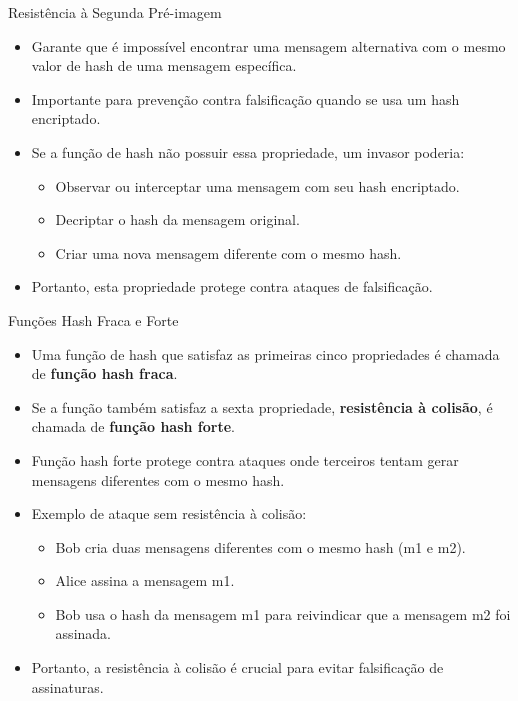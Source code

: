 \begin{frame}{Resistência à Segunda Pré-imagem}
    \begin{itemize}
        \item Garante que é impossível encontrar uma mensagem alternativa com o mesmo valor de hash de uma mensagem específica.
        \item Importante para prevenção contra falsificação quando se usa um hash encriptado.
        \item Se a função de hash não possuir essa propriedade, um invasor poderia:
        \begin{itemize}
            \item Observar ou interceptar uma mensagem com seu hash encriptado.
            \item Decriptar o hash da mensagem original.
            \item Criar uma nova mensagem diferente com o mesmo hash.
        \end{itemize}
        \item Portanto, esta propriedade protege contra ataques de falsificação.
    \end{itemize}
\end{frame}

\begin{frame}{Funções Hash Fraca e Forte}
    \begin{itemize}
        \item Uma função de hash que satisfaz as primeiras cinco propriedades é chamada de \textbf{função hash fraca}.
        \item Se a função também satisfaz a sexta propriedade, \textbf{resistência à colisão}, é chamada de \textbf{função hash forte}.
        \item Função hash forte protege contra ataques onde terceiros tentam gerar mensagens diferentes com o mesmo hash.
        \item Exemplo de ataque sem resistência à colisão:
        \begin{itemize}
            \item Bob cria duas mensagens diferentes com o mesmo hash (m1 e m2).
            \item Alice assina a mensagem m1.
            \item Bob usa o hash da mensagem m1 para reivindicar que a mensagem m2 foi assinada.
        \end{itemize}
        \item Portanto, a resistência à colisão é crucial para evitar falsificação de assinaturas.
    \end{itemize}
\end{frame}

